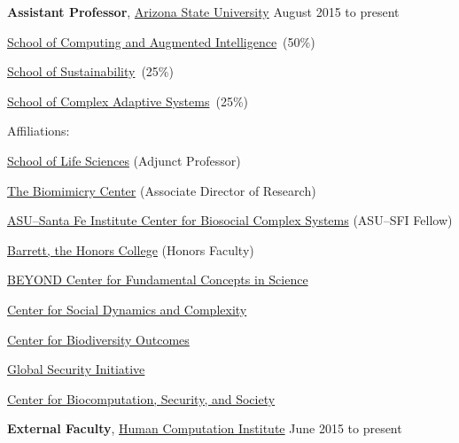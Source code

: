 \documentclass[10pt]{article}
\newcommand{\halfblankline}{\quad\vspace{-0.5\baselineskip}\pagebreak[3]}
\begin{document}
\textbf{Assistant Professor},
            \href{http://www.asu.edu/}{Arizona State University}
            \hfill {August 2015 to present}
\begin{innerlist}

    \item[] \href{http://cidse.engineering.asu.edu/}{School of
        Computing and Augmented Intelligence}~(50\%)
    \item[] \href{http://sustainability.asu.edu/}{School of
        Sustainability}~(25\%)
    \item[] \href{http://sustainability.asu.edu/}{School of Complex
        Adaptive Systems}~(25\%)
    \begin{innerlist}
        \item Affiliations:
            \begin{innerlist}
                \item \href{http://sols.asu.edu}{School of Life Sciences} (Adjunct Professor)
                \item \href{http://biomimicry.asu.edu/}{The Biomimicry Center} (Associate Director of Research)
                \item \href{https://complexity.asu.edu/asu-sfi-center-biosocial-complex-systems}{ASU--Santa Fe Institute Center for Biosocial Complex Systems} (ASU--SFI Fellow)
                \item \href{http://barretthonors.asu.edu/}{Barrett, the Honors College} (Honors Faculty)
                \item \href{http://beyond.asu.edu/}{BEYOND Center for Fundamental Concepts in Science}
                \item \href{http://csdc.asu.edu/}{Center for Social Dynamics and Complexity}
                \item \href{http://sustainability.asu.edu/biodiversityoutcomes/}{Center for Biodiversity Outcomes}
                \item \href{http://globalsecurity.asu.edu/}{Global Security Initiative}
                \item \href{https://biodesign.asu.edu/biocomputing-security-and-society}{Center for Biocomputation, Security, and Society}
            \end{innerlist}
    \end{innerlist}

\end{innerlist}

\halfblankline

\textbf{External Faculty},
        \href{http://humancomputation.org/}{Human Computation Institute}
        \hfill {June 2015 to present}
\end{document}
